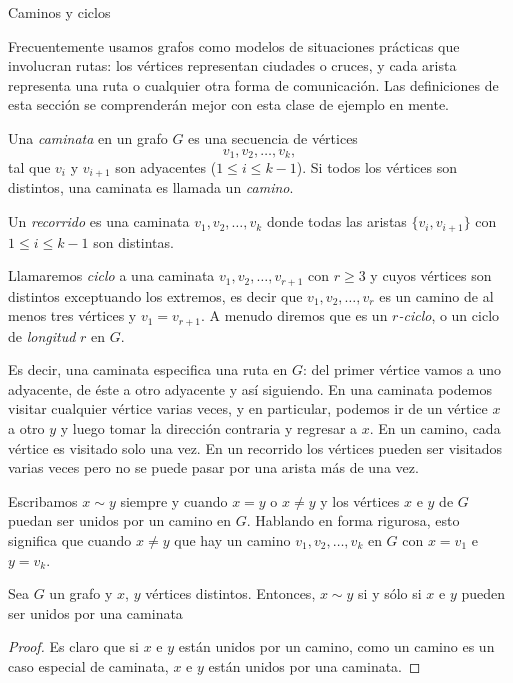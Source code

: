 \begin{section}{Caminos y ciclos}\label{seccion-caminos-y-ciclos}

Frecuentemente usamos grafos como modelos de situaciones prácticas que involucran rutas: los vértices representan ciudades o cruces, y cada arista representa una ruta o cualquier otra forma de comunicación. Las definiciones de esta sección se comprenderán mejor con esta clase de ejemplo en mente.

\begin{definicion}  Una \textit{caminata} en un grafo $G$ es   una secuencia de vértices
$$
v_1,v_2,\ldots,v_k,
$$
tal que $v_i$ y $v_{i+1}$ son adyacentes ($1 \le i \le k-1$). Si todos los vértices son distintos, una caminata es llamada un \textit{camino}.  

Un \textit{recorrido} es una caminata $v_1,v_2,\ldots,v_k$ donde todas las aristas $\{v_i,v_{i+1}\}$ con $1 \le i \le k-1$ son distintas.  

Llamaremos \textit{ciclo} a una caminata  $v_1,v_2,\ldots,v_{r+1}$  con $r \ge 3$ y cuyos vértices son distintos exceptuando los extremos, es decir que $v_1,v_2,\ldots,v_{r}$ es un camino de al menos tres vértices y $v_1=v_{r+1}$.  A menudo diremos que es un \textit{$r$-ciclo}, o un ciclo de \textit{longitud} $r$ en $G$.  
\end{definicion}

Es decir, una caminata especifica una ruta en $G$: del primer vértice vamos a uno adyacente, de éste a otro adyacente y así siguiendo. En una caminata podemos visitar cualquier vértice varias veces, y en particular, podemos ir de un vértice $x$ a otro $y$ y luego tomar la dirección contraria y regresar a $x$. En un camino, cada vértice es visitado solo una vez. En un recorrido los vértices pueden ser visitados varias veces pero no se puede pasar por una arista más de una vez. 

Escribamos $x \sim y$ siempre y cuando $x=y$ o $x \ne y$ y los vértices $x$ e $y$ de $G$ puedan ser unidos por un camino en $G$. Hablando en forma rigurosa, esto significa que cuando $x \ne y$  que hay un camino $v_1,v_2,\ldots,v_k$ en $G$ con $x=v_1$ e $y=v_k$. 

\begin{lema} Sea $G$ un grafo y $x$, $y$  vértices distintos. Entonces, $x \sim y$ si  y sólo si $x$ e $y$ pueden ser unidos por una caminata 
\end{lema}
\begin{proof}Es claro que si $x$ e $y$ están unidos por un camino, como  un camino es un caso especial de caminata, $x$ e $y$ están unidos por una caminata.


\end{proof}
\end{section}
